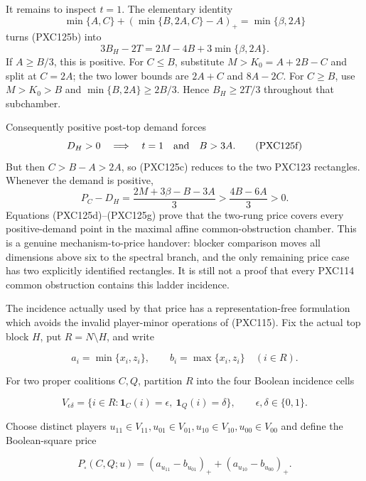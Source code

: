 \documentclass[11pt]{article}
\newcommand{\one}{\mathbf 1}
\begin{document}
It remains to inspect \(t=1\).  The elementary identity
\[
 \min\{A,C\}+(\min\{B,2A,C\}-A)_+
 =\min\{\beta,2A\}
\]
turns (PXC125b) into
\[
 3B_H-2T=2M-4B+3\min\{\beta,2A\}.
\]
If \(A\ge B/3\), this is positive.  For \(C\le B\), substitute
\(M>K_0=A+2B-C\) and split at \(C=2A\); the two lower bounds are
\(2A+C\) and \(8A-2C\).  For \(C\ge B\), use \(M>K_0>B\) and
\(\min\{B,2A\}\ge2B/3\).  Hence \(B_H\ge2T/3\) throughout that subchamber.

Consequently positive post-top demand forces
\begin{equation}
                 D_H>0\quad\Longrightarrow\quad
                 t=1\quad\hbox{and}\quad B>3A.       \tag{PXC125f}
\end{equation}
But then \(C>B-A>2A\), so (PXC125c) reduces to the two PXC123 rectangles.
Whenever the demand is positive,
\begin{equation}
 P_C-D_H
 =\frac{2M+3\beta-B-3A}{3}
 >\frac{4B-6A}{3}>0.                                \tag{PXC125g}
\end{equation}
Equations (PXC125d)--(PXC125g) prove that the two-rung price covers every
positive-demand point in the maximal affine common-obstruction chamber.
This is a genuine mechanism-to-price handover: blocker comparison moves all
dimensions above six to the spectral branch, and the only remaining price
case has two explicitly identified rectangles.  It is still not a proof
that every PXC114 common obstruction contains this ladder incidence.

The incidence actually used by that price has a representation-free
formulation which avoids the invalid player-minor operations of (PXC115).
Fix the actual top block $H$, put $R=N\setminus H$, and write

\[
 a_i=\min\{x_i,z_i\},\qquad b_i=\max\{x_i,z_i\}\quad(i\in R).
\]

For two proper coalitions $C,Q$, partition $R$ into the four Boolean
incidence cells

\[
 V_{\epsilon\delta}=\{i\in R:
       \one_C(i)=\epsilon,\ \one_Q(i)=\delta\},
       \qquad \epsilon,\delta\in\{0,1\}.
\]

Choose distinct players
$u_{11}\in V_{11},u_{01}\in V_{01},u_{10}\in V_{10},u_{00}\in V_{00}$
and define the Boolean-square price

\begin{equation}
 P_{\square}(C,Q;u)
 =(a_{u_{11}}-b_{u_{01}})_+
  +(a_{u_{10}}-b_{u_{00}})_+.
                                                               \tag{PXC126a}
\end{equation}
\end{document}
